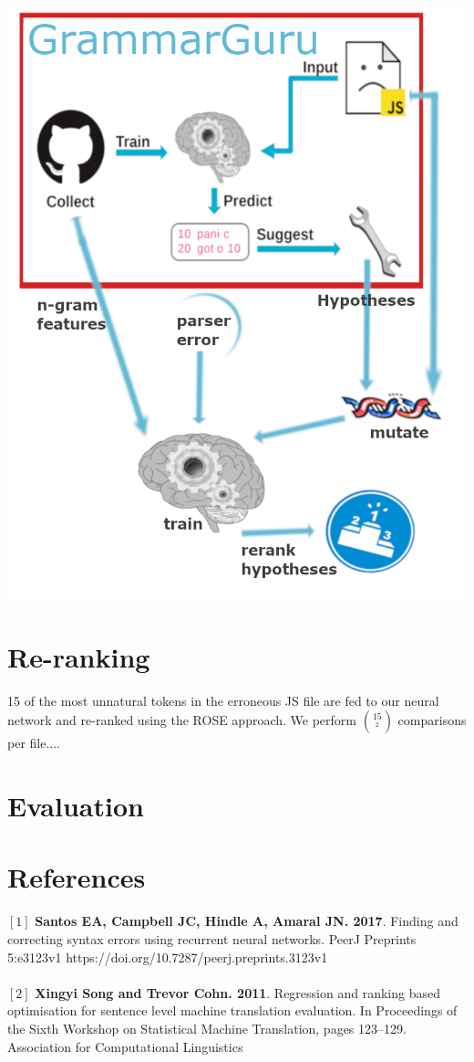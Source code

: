 \documentclass[a0,portrait]{a0poster}
\begin{document}
\begin{multicols}{2}
\color{Navy}
\begin{center}
\includegraphics[width=0.8\linewidth]{proj_img}
\end{center}
\section*{Re-ranking}
15 of the most unnatural tokens in the erroneous JS file are fed to our neural network and re-ranked using the ROSE approach. We perform $15 \choose^{2}$ comparisons per file....


\section*{Evaluation}

\section*{References}
\large
$[1]$ \textbf{Santos EA, Campbell JC, Hindle A, Amaral JN. 2017}. Finding and correcting syntax errors using recurrent neural networks. PeerJ Preprints 5:e3123v1 https://doi.org/10.7287/peerj.preprints.3123v1
\\
\\
$[2]$ \textbf{Xingyi Song and Trevor Cohn. 2011}. Regression and ranking based optimisation for sentence level machine translation evaluation. In Proceedings of the Sixth Workshop on Statistical Machine Translation, pages 123–129. Association for Computational Linguistics
\end{multicols}
\end{document}
